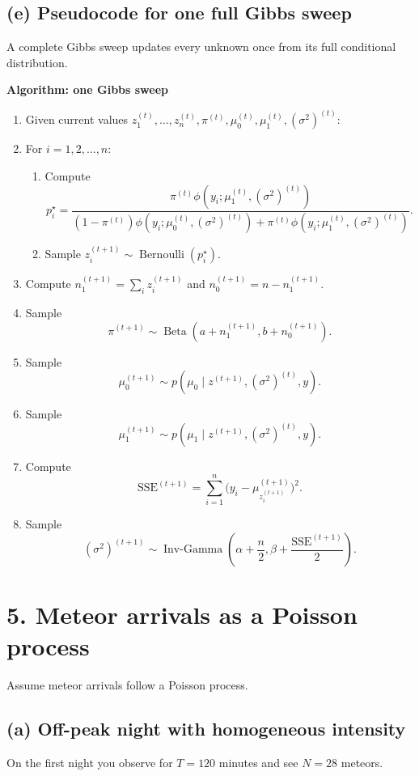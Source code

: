 \documentclass[11pt]{article}
\begin{document}
\subsection*{(e) Pseudocode for one full Gibbs sweep}
A complete Gibbs sweep updates every unknown once from its full conditional distribution.

\textbf{Algorithm: one Gibbs sweep}
\begin{enumerate}[label=\arabic*.]
\item Given current values $z_1^{(t)},\dots,z_n^{(t)},\pi^{(t)},\mu_0^{(t)},\mu_1^{(t)},(\sigma^2)^{(t)}$:
\item For $i=1,2,\dots,n$:
\begin{enumerate}[label=(\alph*)]
\item Compute
\[
p_i^\star=
\frac{\pi^{(t)}\phi(y_i;\mu_1^{(t)},(\sigma^2)^{(t)})}{(1-\pi^{(t)})\phi(y_i;\mu_0^{(t)},(\sigma^2)^{(t)})+\pi^{(t)}\phi(y_i;\mu_1^{(t)},(\sigma^2)^{(t)})}.
\]
\item Sample $z_i^{(t+1)}\sim \operatorname{Bernoulli}(p_i^\star)$.
\end{enumerate}
\item Compute $n_1^{(t+1)}=\sum_i z_i^{(t+1)}$ and $n_0^{(t+1)}=n-n_1^{(t+1)}$.
\item Sample
\[
\pi^{(t+1)}\sim \operatorname{Beta}(a+n_1^{(t+1)},b+n_0^{(t+1)}).
\]
\item Sample
\[
\mu_0^{(t+1)}\sim p(\mu_0\mid z^{(t+1)},(\sigma^2)^{(t)},y).
\]
\item Sample
\[
\mu_1^{(t+1)}\sim p(\mu_1\mid z^{(t+1)},(\sigma^2)^{(t)},y).
\]
\item Compute
\[
\mathrm{SSE}^{(t+1)}=\sum_{i=1}^n\bigl(y_i-\mu_{z_i^{(t+1)}}^{(t+1)}\bigr)^2.
\]
\item Sample
\[
(\sigma^2)^{(t+1)}\sim \operatorname{Inv\text{-}Gamma}\left(\alpha+\frac n2,\beta+\frac{\mathrm{SSE}^{(t+1)}}{2}\right).
\]
\end{enumerate}

\newpage
\section*{5. Meteor arrivals as a Poisson process}

Assume meteor arrivals follow a Poisson process.

\subsection*{(a) Off-peak night with homogeneous intensity}
On the first night you observe for $T=120$ minutes and see $N=28$ meteors.
\end{document}

